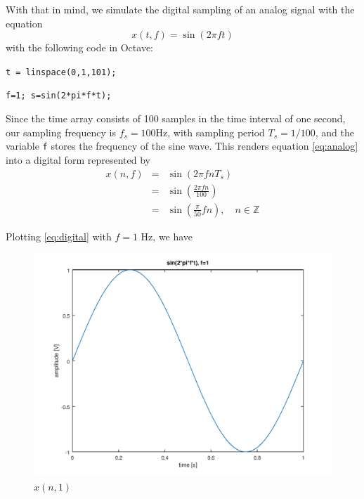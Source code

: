 \documentclass[a4paper, 12pt]{report}
\begin{document}
			With that in mind, we simulate the digital sampling of an analog signal with the equation
			\begin{equation}
				x(t,f) = \sin(2\pi f t)
				\label{eq:analog}
			\end{equation}
			\noindent with the following code in Octave:\par
			\texttt{t = linspace(0,1,101);}\par
			\texttt{f=1; s=sin(2*pi*f*t);}\par

			\vspace*{1em}\noindent Since the time array consists of 100 samples in the time interval of one second, our sampling frequency is $f_s = 100 \text{Hz}$, with sampling period $T_s = 1/100$, and the variable \texttt{f} stores the frequency of the sine wave. This renders equation \ref{eq:analog} into a digital form represented by
			\begin{equation}
				\begin{array}{rcl}
					x(n, f) & = & \sin(2\pi fnT_s) \\
					& = & \sin\left(\frac{2\pi f n}{100}\right)\\
					& = & \sin\left(\frac{\pi}{50}fn\right), \quad n \in \mathbb{Z}
				\end{array}
				\label{eq:digital}
			\end{equation}

			Plotting \ref{eq:digital} with $f=1$ Hz, we have
			\begin{figure}[H]
				\label{fig:1}
				\includegraphics[width=\textwidth]{img/1_1.png}
				\caption{$x(n, 1)$}
			\end{figure}
\end{document}
